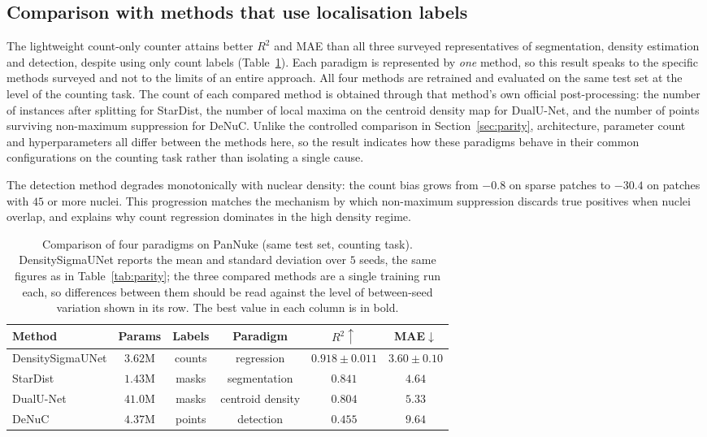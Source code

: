 \documentclass[pdflatex,sn-mathphys-num]{sn-jnl}
\begin{document}
\subsection{Comparison with methods that use localisation labels}\label{sec:paradigm}

The lightweight count-only counter attains better $R^2$ and MAE than all three surveyed representatives of
segmentation, density estimation and detection, despite using only count labels (Table~\ref{tab:paradigm}).
Each paradigm is represented by \emph{one} method, so this result speaks to the specific methods surveyed and
not to the limits of an entire approach. All four methods are retrained and evaluated on the same test set at
the level of the counting task. The count of each compared method is obtained through that method's own
official post-processing: the number of instances after splitting for StarDist, the number of local maxima on
the centroid density map for DualU-Net, and the number of points surviving non-maximum suppression for DeNuC.
Unlike the controlled comparison in Section~\ref{sec:parity}, architecture, parameter count and
hyperparameters all differ between the methods here, so the result indicates how these paradigms behave in
their common configurations on the counting task rather than isolating a single cause.

The detection method degrades monotonically with nuclear density: the count bias grows from $-0.8$ on sparse
patches to $-30.4$ on patches with $45$ or more nuclei. This progression matches the mechanism by which
non-maximum suppression discards true positives when nuclei overlap, and explains why count regression
dominates in the high density regime.

\begin{table}[!htbp]
\centering
\caption{Comparison of four paradigms on PanNuke (same test set, counting task). DensitySigmaUNet reports the
mean and standard deviation over $5$ seeds, the same figures as in Table~\ref{tab:parity}; the three compared
methods are a single training run each, so differences between them should be read against the level of
between-seed variation shown in its row. The best value in each column is in bold.}\label{tab:paradigm}
\begin{tabular}{@{}lccccc@{}}
\toprule
Method & Params & Labels & Paradigm & $R^2\uparrow$ & MAE$\downarrow$ \\
\midrule
DensitySigmaUNet & $3.62$M & counts & regression & $\mathbf{0.918\pm0.011}$ & $\mathbf{3.60\pm0.10}$ \\
StarDist~\cite{stardist} & $1.43$M & masks & segmentation & $0.841$ & $4.64$ \\
DualU-Net~\cite{dualunet} & $41.0$M & masks & centroid density & $0.804$ & $5.33$ \\
DeNuC~\cite{denuc} & $4.37$M & points & detection & $0.455$ & $9.64$ \\
\bottomrule
\end{tabular}
\end{table}
\end{document}
